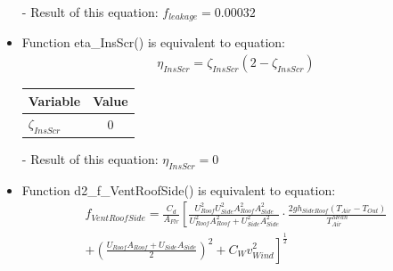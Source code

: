 \documentclass[a4paper]{article}
\begin{document}
\begin{itemize}
  \item[-] Result of this equation: \(f_{leakage} = 0.00032\)

  \item Function eta\_InsScr() is equivalent to equation:
        \begin{align*}
          \eta_{InsScr} = \zeta_{InsScr} (2 -  \zeta_{InsScr})
        \end{align*}

        \begin{table}[H]
          \centering
          \begin{tabular}{@{}lS@{}}
            \toprule
            \textbf{Variable}  & \textbf{Value} \\
            \midrule
            \(\zeta_{InsScr}\) & 0              \\
            \bottomrule
          \end{tabular}
        \end{table}

  \item[-] Result of this equation: \(\eta_{InsScr} = 0\)

  \item Function d2\_f\_VentRoofSide() is equivalent to equation:
        \begin{align*}
          f_{VentRoofSide} = \frac{C_d}{A_{Flr}} \left[\frac{U_{Roof}^2 U_{Side}^2 A_{Roof}^2 A_{Side}^2}{U_{Roof}^2 A_{Roof}^2 + U_{Side}^2 A_{Side}^2} \cdot \frac{2gh_{SideRoof} (T_{Air} - T_{Out})}{T_{Air}^{Mean}}\right. \\
          + \left.{ \left(\frac{U_{Roof} A_{Roof} + U_{Side} A_{Side}}{2}\right)}^2 + C_W v_{Wind}^2\right]^{\frac{1}{2}}
        \end{align*}


\end{itemize}
\end{document}
